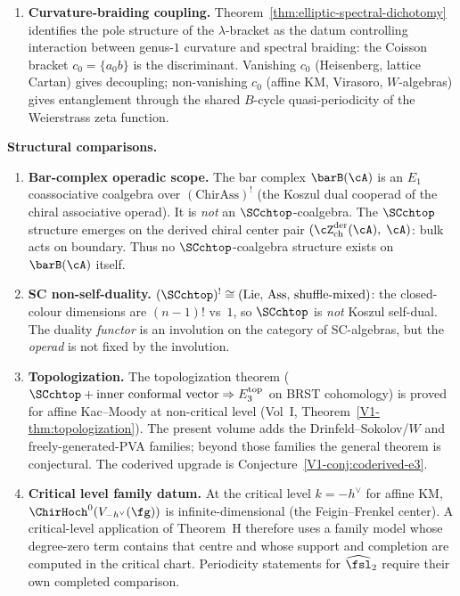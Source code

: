\begin{enumerate}
\item \textbf{Curvature-braiding coupling.} Theorem~\ref{thm:elliptic-spectral-dichotomy} identifies the pole structure of the $\lambda$-bracket as the datum controlling interaction between genus-$1$ curvature and spectral braiding: the Coisson bracket $c_0 = \{a{}_0 b\}$ is the discriminant. Vanishing $c_0$ (Heisenberg, lattice Cartan) gives decoupling; non-vanishing $c_0$ (affine KM, Virasoro, $W$-algebras) gives entanglement through the shared $B$-cycle quasi-periodicity of the Weierstrass zeta function.
\end{enumerate}

\medskip
\noindent\textbf{Structural comparisons.}

\begin{enumerate}[resume]

\item \textbf{Bar-complex operadic scope.}
 The bar complex $\barB(\cA)$ is an $E_1$ coassociative coalgebra over
 $(\mathrm{ChirAss})^!$ (the Koszul dual cooperad of the chiral
 associative operad). It is \emph{not} an $\SCchtop$-coalgebra.
 The $\SCchtop$ structure emerges on the derived chiral center pair
 $(\cZ^{\mathrm{der}}_{\mathrm{ch}}(\cA),\; \cA)$: bulk acts on
 boundary. Thus no $\SCchtop$-coalgebra structure exists on
 $\barB(\cA)$ itself.

\item \textbf{SC non-self-duality.}
 $(\SCchtop)^! \cong (\mathrm{Lie},\, \mathrm{Ass},\,
 \text{shuffle-mixed})$: the closed-colour dimensions are
 $(n{-}1)!$ vs~$1$, so $\SCchtop$ is \emph{not} Koszul self-dual.
 The duality \emph{functor} is an involution on the category of
 SC-algebras, but the \emph{operad} is not fixed by the involution.

\item \textbf{Topologization.}
 The topologization theorem
 ($\SCchtop + \text{inner conformal vector} \Rightarrow E_3^{\mathrm{top}}$
 on BRST cohomology)
 is proved for affine Kac--Moody at non-critical level
 (Vol~I, Theorem~\ref*{V1-thm:topologization}).
 The present volume adds the Drinfeld--Sokolov/$W$ and
 freely-generated-PVA families; beyond those families the
 general theorem is conjectural. The coderived upgrade is
 Conjecture~\ref*{V1-conj:coderived-e3}.

\item \textbf{Critical level family datum.}
 At the critical level $k = -h^\vee$ for affine KM,
 $\ChirHoch^0(V_{-h^\vee}(\fg))$ is infinite-dimensional
 (the Feigin--Frenkel center).  A critical-level application of
 Theorem~H therefore uses a family model whose degree-zero term
 contains that centre and whose support and completion are computed
 in the critical chart.  Periodicity statements for
 $\widehat{\fsl}_2$ require their own completed comparison.


\end{enumerate}
